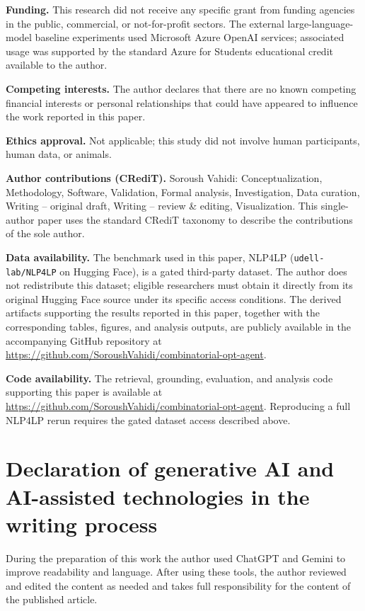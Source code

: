 \documentclass[3p]{elsarticle}
\begin{document}
\noindent\textbf{Funding.} This research did not receive any specific grant from funding agencies in the public, commercial, or not-for-profit sectors. The external large-language-model baseline experiments used Microsoft Azure OpenAI services; associated usage was supported by the standard Azure for Students educational credit available to the author.

\noindent\textbf{Competing interests.} The author declares that there are no known competing financial interests or personal relationships that could have appeared to influence the work reported in this paper.

\noindent\textbf{Ethics approval.} Not applicable; this study did not involve human participants, human data, or animals.

\noindent\textbf{Author contributions (CRediT).} Soroush Vahidi: Conceptualization, Methodology, Software, Validation, Formal analysis, Investigation, Data curation, Writing -- original draft, Writing -- review \& editing, Visualization. This single-author paper uses the standard CRediT taxonomy to describe the contributions of the sole author.

\noindent\textbf{Data availability.} The benchmark used in this paper, NLP4LP (\texttt{udell-lab/NLP4LP} on Hugging Face), is a gated third-party dataset. The author does not redistribute this dataset; eligible researchers must obtain it directly from its original Hugging Face source under its specific access conditions. The derived artifacts supporting the results reported in this paper, together with the corresponding tables, figures, and analysis outputs, are publicly available in the accompanying GitHub repository at \url{https://github.com/SoroushVahidi/combinatorial-opt-agent}.

\noindent\textbf{Code availability.} The retrieval, grounding, evaluation, and analysis code supporting this paper is available at \url{https://github.com/SoroushVahidi/combinatorial-opt-agent}. Reproducing a full NLP4LP rerun requires the gated dataset access described above.

\section*{Declaration of generative AI and AI-assisted technologies in the writing process}

During the preparation of this work the author used ChatGPT and Gemini to improve readability and language. After using these tools, the author reviewed and edited the content as needed and takes full responsibility for the content of the published article.
\end{document}
